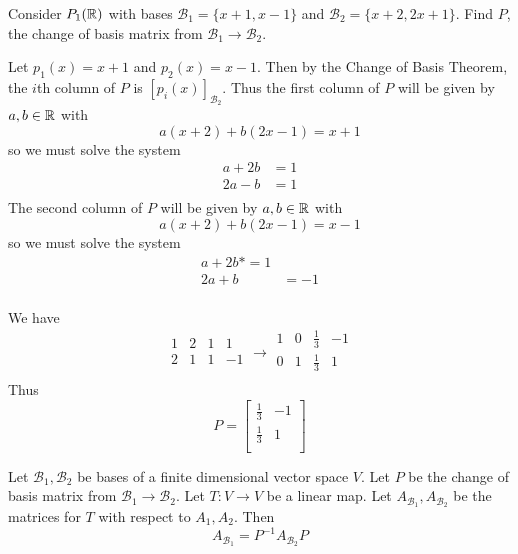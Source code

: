 \documentclass{article}
\begin{document}
\begin{example}
  Consider $P_1(\mathbb{R})$ with bases $\mathcal{B}_1 = \{x+1, x-1\}$ and $\mathcal{B}_2 = \{x+2, 2x + 1\}$. Find $P$, the change of basis matrix from $\mathcal{B}_1 \to \mathcal{B}_2$.

  Let $p_1(x) = x+1$ and $p_2(x) = x-1$. Then by the Change of Basis Theorem, the $i$th column of $P$ is $[p_i(x)]_{\mathcal{B}_2}$. Thus the first column of $P$ will be given by $a, b \in \mathbb{R}$ with \[
    a(x+2) + b(2x-1) = x+1
  \] so we must solve the system
  \begin{align*}
    a + 2b & = 1 \\
    2a - b & = 1 \\
  \end{align*}
  The second column of $P$ will be given by $a, b \in \mathbb{R}$ with \[
    a(x+2) + b(2x-1) = x - 1
  \] so we must solve the system
  \begin{align*}
    a + 2b *= 1   \\
    2a + b & = -1 \\
  \end{align*}

  We have \[
    \begin{array}{cc|cc}
      1 & 2 & 1 & 1  \\
      2 & 1 & 1 & -1 \\
    \end{array} \to
    \begin{array}{cc|cc}
      1 & 0 & \frac{1}{3} & -1 \\
      0 & 1 & \frac{1}{3} & 1  \\
    \end{array}
  \]Thus \[
    P =
    \begin{bmatrix}
      \frac{1}{3} & -1 \\
      \frac{1}{3} & 1  \\
    \end{bmatrix}
  \]
\end{example}
\begin{theorem}
  Let $\mathcal{B}_1, \mathcal{B}_2$ be bases of a finite dimensional vector space $V$. Let $P$ be the change of basis matrix from $\mathcal{B}_1 \to \mathcal{B}_2$. Let $T: V \to V$ be a linear map. Let $A_{\mathcal{B}_1}, A_{\mathcal{B}_2}$ be the matrices for $T$ with respect to $A_1, A_2$. Then \[
    A_{\mathcal{B}_1} = P^{-1}A_{\mathcal{B}_2}P
  \]
\end{theorem}
\end{document}
